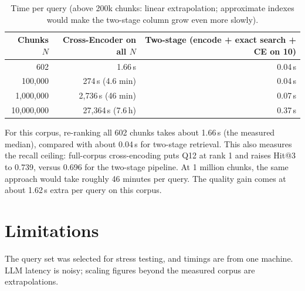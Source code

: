 \documentclass[10pt,a4paper]{article}
\begin{document}
\begin{table}[h]
\centering
\begin{tabular}{rrr}
\toprule
Chunks $N$ & Cross-Encoder on all $N$ & Two-stage (encode + exact search + CE on 10) \\
\midrule
602        & 1.66\,s             & 0.04\,s \\
100,000    & 274\,s (4.6 min)    & 0.04\,s \\
1,000,000  & 2,736\,s (46 min)   & 0.07\,s \\
10,000,000 & 27,364\,s (7.6\,h)  & 0.37\,s \\
\bottomrule
\end{tabular}
\caption{Time per query (above 200k chunks: linear extrapolation; approximate indexes would make the two-stage column grow even more slowly).}
\end{table}

For this corpus, re-ranking all 602 chunks takes about 1.66\,s (the measured median), compared with about 0.04\,s for two-stage retrieval. This also measures the recall ceiling: full-corpus cross-encoding puts Q12 at rank 1 and raises Hit@3 to 0.739, versus 0.696 for the two-stage pipeline. At 1 million chunks, the same approach would take roughly 46 minutes per query. The quality gain comes at about 1.62\,s extra per query on this corpus.

\section*{Limitations}
The query set was selected for stress testing, and timings are from one machine. LLM latency is noisy; scaling figures beyond the measured corpus are extrapolations.
\end{document}

